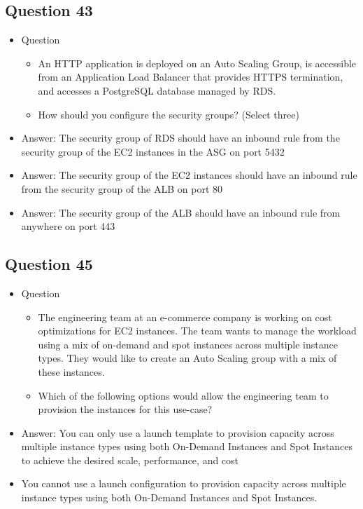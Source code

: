 \documentclass[]{scrartcl}
\begin{document}
\subsection{Question 43}
\begin{itemize}
	\item Question
	\begin{itemize}
		\item An HTTP application is deployed on an Auto Scaling Group, is accessible from an Application Load Balancer that provides HTTPS termination, and accesses a PostgreSQL database managed by RDS.
		\item How should you configure the security groups? (Select three)
	\end{itemize}
	\item Answer: The security group of RDS should have an inbound rule from the security group of the EC2 instances in the ASG on port 5432
	\item Answer: The security group of the EC2 instances should have an inbound rule from the security group of the ALB on port 80
	\item Answer: The security group of the ALB should have an inbound rule from anywhere on port 443
\end{itemize}

\subsection{Question 45}
\begin{itemize}
	\item Question
	\begin{itemize}
		\item The engineering team at an e-commerce company is working on cost optimizations for EC2 instances. The team wants to manage the workload using a mix of on-demand and spot instances across multiple instance types. They would like to create an Auto Scaling group with a mix of these instances.
		\item Which of the following options would allow the engineering team to provision the instances for this use-case?
	\end{itemize}
	\item Answer: You can only use a launch template to provision capacity across multiple instance types using both On-Demand Instances and Spot Instances to achieve the desired scale, performance, and cost
	\item You cannot use a launch configuration to provision capacity across multiple instance types using both On-Demand Instances and Spot Instances. 
\end{itemize}
\end{document}
